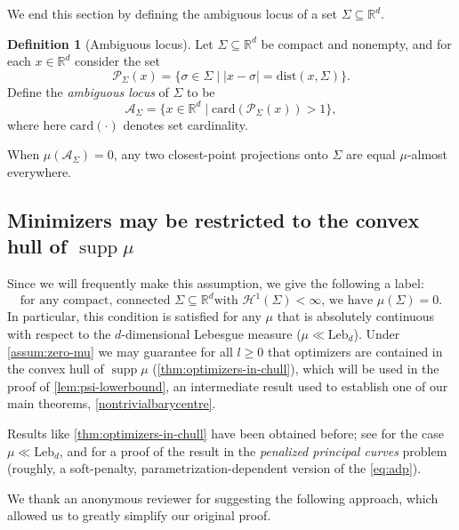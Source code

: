 \documentclass[preprint, reqno]{amsart}
\DeclareMathOperator*{\supp}{supp}
\newcommand{\dist}{\mathrm{dist}}
\newcommand{\card}{\mathrm{card}}
\theoremstyle{definition}
\newtheorem{definition}{Definition}[section]
\numberwithin{equation}{section}
\begin{document}
We end this section by defining the ambiguous locus of a set $\Sigma
\subseteq \mathbb{R}^d$.

\begin{definition}[Ambiguous locus]\label{def:ambiguouslocus}
  Let $\Sigma \subseteq \mathbb{R}^d$ be compact and nonempty, and for
  each $x \in \mathbb{R}^d$ consider the set $$\mathcal{P}_{\Sigma}(x)
  = \{\sigma \in \Sigma \mid |x - \sigma| = \dist(x, \Sigma)\}.$$
  Define the \textit{ambiguous locus} of $\Sigma$ to be
  \[
    \mathcal{A}_{\Sigma} = \{x \in \mathbb{R}^d \mid \card(
    \mathcal{P}_{\Sigma}(x)) > 1\},
  \]
  where here $\card( \cdot )$ denotes set cardinality.
\end{definition}
When $\mu(\mathcal{A}_{\Sigma}) = 0$, any two closest-point
projections onto $\Sigma$ are equal $\mu$-almost everywhere.

\subsection{Minimizers may be restricted to the convex hull of
  $\supp \mu$} \label{sec:restricting-minimizers-to-convex-hull}

Since we will frequently make this assumption, we give the following a
label:
\begin{equation}\label{assum:zero-mu}
  \text{for any compact, connected $\Sigma \subseteq \mathbb{R}^d$
    with $\mathcal{H}^1(\Sigma) < \infty$, we have $\mu(\Sigma) = 0$.}
\end{equation}
In particular, this condition is satisfied for any $\mu$
that is absolutely continuous with respect to the $d$-dimensional
Lebesgue measure ($\mu \ll \mathrm{Leb}_d$). Under
\eqref{assum:zero-mu} we may guarantee for all $l \geq 0$ that
optimizers are contained in the convex hull of $\supp \mu$
(\cref{thm:optimizers-in-chull}), which will be used in the proof of
\cref{lem:psi-lowerbound}, an intermediate result used to
establish one of our main theorems, \cref{nontrivialbarycentre}.

Results like \cref{thm:optimizers-in-chull} have been obtained before;
see \cite[Proposition 5.1]{Buttazzo03} for the case $\mu \ll
\mathrm{Leb}_d$, and \cite[Lemma 2.2]{Lu2016Apr} for a proof of the
result in the \emph{penalized principal curves} problem (roughly, a
soft-penalty, parametrization-dependent version of the
\eqref{eq:adp}).

We thank an anonymous reviewer for suggesting the following approach,
which allowed us to greatly simplify our original proof.
\end{document}
